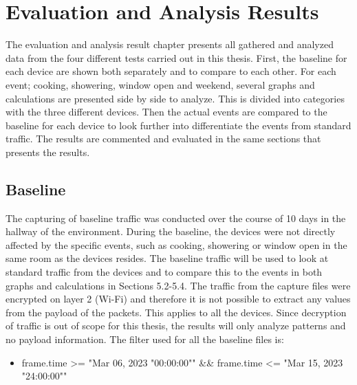 \chapter{Evaluation and Analysis Results}
The evaluation and analysis result chapter presents all gathered and analyzed data from the four different tests carried out in this thesis. First, the baseline for each device are shown both separately and to compare to each other. For each event; cooking, showering, window open and weekend, several graphs and calculations are presented side by side to analyze. This is divided into categories with the three different devices. Then the actual events are compared to the baseline for each device to look further into differentiate the events from standard traffic. The results are commented and evaluated in the same sections that presents the results. 

\section{Baseline}
The capturing of baseline traffic was conducted over the course of 10 days in the hallway of the environment. During the baseline, the devices were not directly affected by the specific events, such as cooking, showering or window open in the same room as the devices resides. The baseline traffic will be used to look at standard traffic from the devices and to compare this to the events in both graphs and calculations in Sections 5.2-5.4. The traffic from the capture files were encrypted on layer 2 (\gls{Wi-Fi}) and therefore it is not possible to extract any values from the payload of the packets. This applies to all the devices. Since decryption of traffic is out of scope for this thesis, the results will only analyze patterns and no payload information. The filter used for all the baseline files is:

\begin{itemize}
\item frame.time >= "Mar 06, 2023 "00:00:00"" \&\& frame.time <= "Mar 15, 2023 "24:00:00""
\end{itemize}

